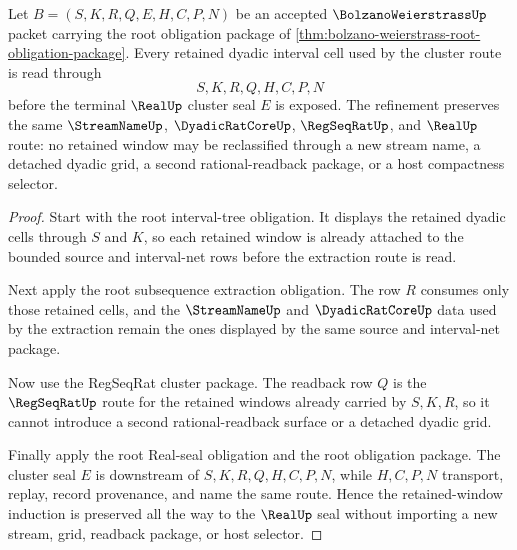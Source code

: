 \begin{theorem}
\label{thm:bolzano-weierstrass-window-retention-refinement}
Let $B=(S,K,R,Q,E,H,C,P,N)$ be an accepted $\BolzanoWeierstrassUp$ packet carrying the root obligation package of \autoref{thm:bolzano-weierstrass-root-obligation-package}. Every retained dyadic interval cell used by the cluster route is read through
$$
S,K,R,Q,H,C,P,N
$$
before the terminal $\RealUp$ cluster seal $E$ is exposed. The refinement preserves the same $\StreamNameUp$, $\DyadicRatCoreUp$, $\RegSeqRatUp$, and $\RealUp$ route: no retained window may be reclassified through a new stream name, a detached dyadic grid, a second rational-readback package, or a host compactness selector.
\end{theorem}
\begin{proof}
Start with the root interval-tree obligation. It displays the retained dyadic cells through $S$ and $K$, so each retained window is already attached to the bounded source and interval-net rows before the extraction route is read.

Next apply the root subsequence extraction obligation. The row $R$ consumes only those retained cells, and the $\StreamNameUp$ and $\DyadicRatCoreUp$ data used by the extraction remain the ones displayed by the same source and interval-net package.

Now use the RegSeqRat cluster package. The readback row $Q$ is the $\RegSeqRatUp$ route for the retained windows already carried by $S,K,R$, so it cannot introduce a second rational-readback surface or a detached dyadic grid.

Finally apply the root Real-seal obligation and the root obligation package. The cluster seal $E$ is downstream of $S,K,R,Q,H,C,P,N$, while $H,C,P,N$ transport, replay, record provenance, and name the same route. Hence the retained-window induction is preserved all the way to the $\RealUp$ seal without importing a new stream, grid, readback package, or host selector.
\end{proof}
